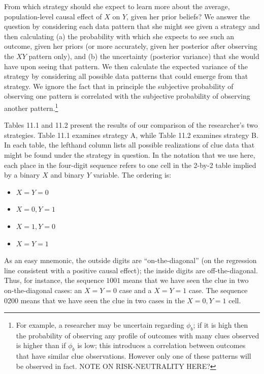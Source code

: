 \documentclass[12pt,]{book}
\providecommand{\tightlist}{%
  \setlength{\itemsep}{0pt}\setlength{\parskip}{0pt}}
\let\rmarkdownfootnote\footnote%
\def\footnote{\protect\rmarkdownfootnote}
\begin{document}
From which strategy should she expect to learn more about the average, population-level causal effect of \(X\) on \(Y\), given her prior beliefs? We answer the question by considering each data pattern that she might see given a strategy and then calculating (a) the probability with which she expects to see such an outcome, given her priors (or more accurately, given her posterior after observing the \(XY\) pattern only), and (b) the uncertainty (posterior variance) that she would have upon seeing that pattern. We then calculate the expected variance of the strategy by considering all possible data patterns that could emerge from that strategy. We ignore the fact that in principle the subjective probability of observing one pattern is correlated with the subjective probability of observing another pattern.\footnote{For example, a researcher may be uncertain regarding \(\phi_b\); if it is high then the probability of observing any profile of outcomes with many clues observed is higher than if \(\phi_b\) is low; this introduces a correlation between outcomes that have similar clue observations. However only one of these patterns will be observed in fact. NOTE ON RISK-NEUTRALITY HERE?}

Tables 11.1 and 11.2 present the results of our comparison of the researcher's two strategies. Table 11.1 examines strategy A, while Table 11.2 examines strategy B. In each table, the lefthand column lists all possible realizations of clue data that might be found under the strategy in question. In the notation that we use here, each place in the four-digit sequence refers to one cell in the 2-by-2 table implied by a binary \(X\) and binary \(Y\) variable. The ordering is:

\begin{itemize}
\tightlist
\item
  \(X=Y=0\)
\item
  \(X=0, Y=1\)
\item
  \(X=1, Y=0\)
\item
  \(X=Y=1\)
\end{itemize}

As an easy mnemonic, the outside digits are ``on-the-diagonal'' (on the regression line consistent with a positive causal effect); the inside digits are off-the-diagonal. Thus, for instance, the sequence \(1001\) means that we have seen the clue in two on-the-diagonal cases: an \(X=Y=0\) case and a \(X=Y=1\) case. The sequence 0200 means that we have seen the clue in two cases in the \(X=0, Y=1\) cell.
\end{document}
